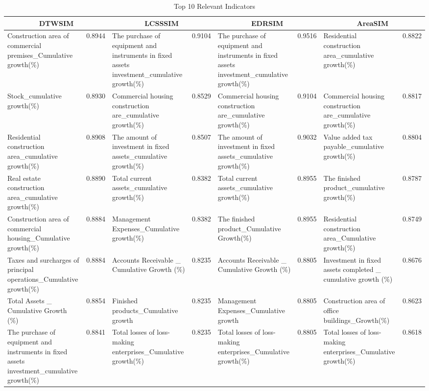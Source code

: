 \begin{table}
\centering
\caption{Top 10 Relevant Indicators}
\label{tab:topindi}

\begin{tabular}{|p{3cm}|c|p{3cm}|c|p{3cm}|c|p{3cm}|c|} \hline
	\multicolumn{2}{|c|}{DTWSIM} & \multicolumn{2}{|c|}{LCSSSIM} &\multicolumn{2}{|c|}{EDRSIM} & \multicolumn{2}{|c|}{AreaSIM}\\ \hline
	Construction area of commercial premises\_Cumulative growth(\%) & 0.8944 & The purchase of equipment and instruments in fixed assets investment\_cumulative growth(\%) & 0.9104 & The purchase of equipment and instruments in fixed assets investment\_cumulative growth(\%)& 0.9516 & Residential construction area\_cumulative growth(\%)& 0.8822\\ \hline
	Stock\_cumulative growth(\%) & 0.8930 & Commercial housing construction are\_cumulative growth(\%) & 0.8529 & Commercial housing construction are\_cumulative growth(\%) & 0.9104 & Commercial housing construction are\_cumulative growth(\%) & 0.8817\\ \hline
	Residential construction area\_cumulative growth(\%) & 0.8908 & The amount of investment in fixed assets\_cumulative growth(\%)& 0.8507 & The amount of investment in fixed assets\_cumulative growth(\%) & 0.9032
 & Value added tax payable\_cumulative growth(\%) & 0.8804\\ \hline
	Real estate construction area\_cumulative growth(\%) & 0.8890 &Total current assets\_cumulative growth(\%) & 0.8382 & Total current assets\_cumulative growth(\%) & 0.8955 & The finished product\_cumulative growth(\%) & 0.8787\\ \hline
	Construction area of commercial housing\_Cumulative growth(\%) & 0.8884 & Management Expenses\_Cumulative growth(\%) & 0.8382
& The finished product\_Cumulative Growth(\%) & 0.8955 & Residential construction area\_Cumulative growth(\%) & 0.8749\\ \hline
	Taxes and surcharges of principal operations\_Cumulative growth(\%) & 0.8884 & Accounts Receivable \_ Cumulative Growth (\%) &0.8235 & Accounts Receivable \_ Cumulative Growth (\%) & 0.8805 & Investment in fixed assets completed \_ cumulative growth (\%) & 0.8676
\\ \hline
	Total Assets \_ Cumulative Growth (\%) & 0.8854 & Finished products\_Cumulative growth& 0.8235& Management Expenses\_Cumulative growth&0.8805 & Construction area of office buildings\_Growth(\%) &0.8623\\ \hline
	The purchase of equipment and instruments in fixed assets investment\_cumulative growth(\%) & 0.8841 &Total losses of loss-making enterprises\_Cumulative growth(\%) & 0.8235 &Total losses of loss-making enterprises\_Cumulative growth(\%)&0.8805 &Total losses of loss-making enterprises\_Cumulative growth(\%) &0.8618\\ \hline

\end{tabular}
\end{table}
